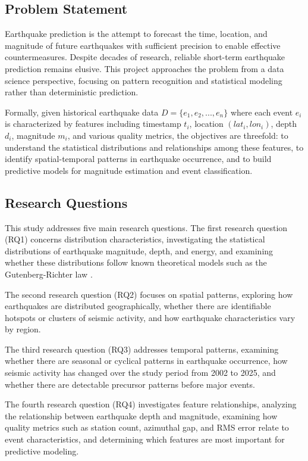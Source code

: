 
\subsection{Problem Statement}

Earthquake prediction is the attempt to forecast the time, location, and magnitude of future earthquakes with sufficient precision to enable effective countermeasures. Despite decades of research, reliable short-term earthquake prediction remains elusive. This project approaches the problem from a data science perspective, focusing on pattern recognition and statistical modeling rather than deterministic prediction.

Formally, given historical earthquake data $D = \{e_1, e_2, ..., e_n\}$ where each event $e_i$ is characterized by features including timestamp $t_i$, location $(lat_i, lon_i)$, depth $d_i$, magnitude $m_i$, and various quality metrics, the objectives are threefold: to understand the statistical distributions and relationships among these features, to identify spatial-temporal patterns in earthquake occurrence, and to build predictive models for magnitude estimation and event classification.

\subsection{Research Questions}

This study addresses five main research questions. The first research question (RQ1) concerns distribution characteristics, investigating the statistical distributions of earthquake magnitude, depth, and energy, and examining whether these distributions follow known theoretical models such as the Gutenberg-Richter law \cite{gutenberg1944}.

The second research question (RQ2) focuses on spatial patterns, exploring how earthquakes are distributed geographically, whether there are identifiable hotspots or clusters of seismic activity, and how earthquake characteristics vary by region.

The third research question (RQ3) addresses temporal patterns, examining whether there are seasonal or cyclical patterns in earthquake occurrence, how seismic activity has changed over the study period from 2002 to 2025, and whether there are detectable precursor patterns before major events.

The fourth research question (RQ4) investigates feature relationships, analyzing the relationship between earthquake depth and magnitude, examining how quality metrics such as station count, azimuthal gap, and RMS error relate to event characteristics, and determining which features are most important for predictive modeling.

